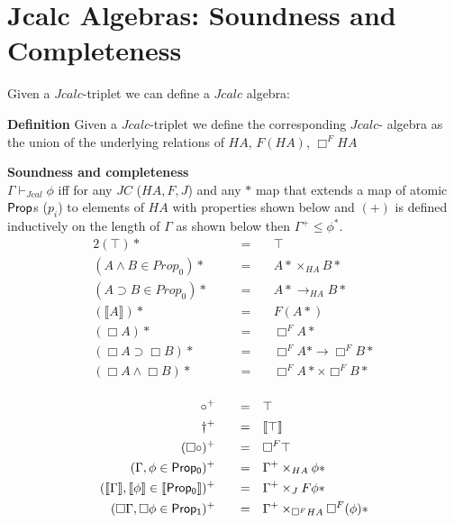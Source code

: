 \section{ Jcalc Algebras: Soundness and Completeness}
Given a $Jcalc$-triplet we can define a $Jcalc$ algebra:
\begin{mdframed}
    \textbf{Definition}
    Given a $Jcalc$-triplet we define the corresponding $Jcalc$-
     algebra as the union of the underlying relations
    of   $HA$, $F(HA)$, $\Box^{F}HA$
\end{mdframed}
    \begin{theorem}\label{thm:cmpjtriplet}
        \textbf{Soundness and completeness}\\
    $\Gamma\vdash_{Jcal}\phi$ iff for any   $JC$ ($HA,F,J$)
    and any $*$ map that extends  a map of atomic $\prop$s ($p_i$) to elements of $HA$ 
    with properties shown below and $(+)$ 
    is defined inductively on the length of $\Gamma$ as shown below
    then $\Gamma^+\leq\phi^{*}$.
    \begin{alignat*}{2}
        (\top)* &&\quad= & \quad\top\\
        (A\wedge B \in Prop_0)*  &&\quad = & \quad  A*\times_{HA}B*\\
        (A\supset B \in Prop_0)*  &&\quad = & \quad A*\rightarrow_{HA} B*\\
        (\llbracket A\rrbracket)* && \quad = & \quad F(A*)\\					
        (\Box A)* &&\quad = & \quad\Box^F A* \\
        (\Box A\supset \Box B)*  &&\quad = & \quad\Box^F A* \rightarrow{\Box^F B*}\\
        (\Box A\wedge\Box B)*  &&\quad = & \quad\Box^F A*\times{\Box^F B*}\\
    \end{alignat*}
    
    \begin{alignat*}{2}
      \circ^+  &&\quad = & \quad\top\\
      \dagger^+ &&\quad = & \quad\llbracket\top\rrbracket\\
      (\Box\circ)^+ &&\quad = & \quad\Box^F \top\\
      (\Gamma,\phi\in \sf {Prop_0})^+&&\quad = &\quad
      \Gamma^+\times_{HA}\phi* \\
      (\llbracket \Gamma\rrbracket,\llbracket\phi\rrbracket \in {\sf \llbracket Prop_0\rrbracket})^+&&\quad = &\quad
      \Gamma^+\times_{J}F\phi*\\
      (\Box\Gamma, \Box\phi \in {\sf Prop_1})^+&&\quad = &\quad
      \Gamma^+\times_{\Box^{F}HA}\Box^F (\phi)*\\
    \end{alignat*}
    \end{theorem}
